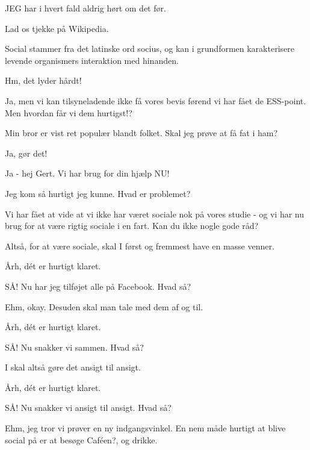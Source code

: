 \documentclass[a4paper,11pt]{article}
\begin{document}
\begin{sketch}
 JEG har i hvert fald aldrig hørt om det før.

 Lad os tjekke på Wikipedia.


 Social stammer fra det latinske ord socius, og kan i grundformen karakterisere levende organismers interaktion med hinanden.

 Hm, det lyder hårdt!

 Ja, men vi kan tilsyneladende ikke få vores bevis førend vi har fået de ESS-point. Men hvordan får vi dem hurtigst!?

 Min bror er vist ret populær blandt folket. Skal jeg prøve at få fat i ham?

 Ja, gør det!

 Ja - hej Gert. Vi har brug for din hjælp NU!


 Jeg kom så hurtigt jeg kunne. Hvad er problemet?

 Vi har fået at vide at vi ikke har været sociale nok på vores studie - og vi har nu brug for at være rigtig sociale i en fart. Kan du ikke nogle gode råd?

 Altså, for at være sociale, skal I først og fremmest have en masse venner.

 Årh, dét er hurtigt klaret.


 SÅ! Nu har jeg tilføjet alle på Facebook. Hvad så?

 Ehm, okay. Desuden skal man tale med dem af og til.

 Årh, dét er hurtigt klaret.



 SÅ! Nu snakker vi sammen. Hvad så?

 I skal altså gøre det ansigt til ansigt.

 Årh, dét er hurtigt klaret.


 SÅ! Nu snakker vi ansigt til ansigt. Hvad så?

 Ehm, jeg tror vi prøver en ny indgangsvinkel. En nem måde hurtigt at blive social på er at besøge Caféen?, og drikke.


\end{sketch}
\end{document}
